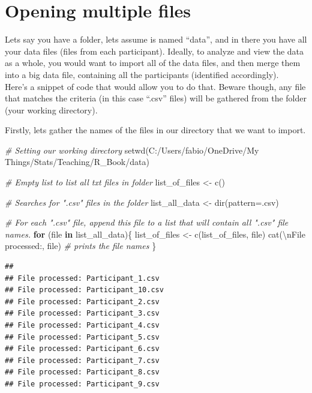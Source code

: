 \documentclass[
]{book}
\newenvironment{Shaded}{\begin{snugshade}}{\end{snugshade}}
\newcommand{\AttributeTok}[1]{\textcolor[rgb]{0.77,0.63,0.00}{#1}}
\newcommand{\CommentTok}[1]{\textcolor[rgb]{0.56,0.35,0.01}{\textit{#1}}}
\newcommand{\ControlFlowTok}[1]{\textcolor[rgb]{0.13,0.29,0.53}{\textbf{#1}}}
\newcommand{\FunctionTok}[1]{\textcolor[rgb]{0.00,0.00,0.00}{#1}}
\newcommand{\NormalTok}[1]{#1}
\newcommand{\OtherTok}[1]{\textcolor[rgb]{0.56,0.35,0.01}{#1}}
\newcommand{\SpecialCharTok}[1]{\textcolor[rgb]{0.00,0.00,0.00}{#1}}
\newcommand{\StringTok}[1]{\textcolor[rgb]{0.31,0.60,0.02}{#1}}
\begin{document}
\hypertarget{opening-multiple-files}{%
\section{Opening multiple files}\label{opening-multiple-files}}

Lets say you have a folder, lets assume is named ``data'', and in there you have all your data files (files from each participant).
Ideally, to analyze and view the data as a whole, you would want to import all of the data files, and then merge them into a big data file, containing all the participants (identified accordingly).\\
Here's a snippet of code that would allow you to do that.
Beware though, any file that matches the criteria (in this case ``.csv'' files) will be gathered from the folder (your working directory).

Firstly, lets gather the names of the files in our directory that we want to import.

\begin{Shaded}
\begin{Highlighting}[]
\CommentTok{\# Setting our working directory}
\FunctionTok{setwd}\NormalTok{(}\StringTok{\textquotesingle{}C:/Users/fabio/OneDrive/My Things/Stats/Teaching/R\_Book/data\textquotesingle{}}\NormalTok{)}

\CommentTok{\# Empty list to list all txt files in folder}
\NormalTok{list\_of\_files }\OtherTok{\textless{}{-}} \FunctionTok{c}\NormalTok{()}

\CommentTok{\# Searches for ".csv" files in the folder}
\NormalTok{list\_all\_data }\OtherTok{\textless{}{-}} \FunctionTok{dir}\NormalTok{(}\AttributeTok{pattern=}\StringTok{\textquotesingle{}.csv\textquotesingle{}}\NormalTok{)}

\CommentTok{\# For each ".csv" file, append this file to a list that will contain all ".csv" file names.}
\ControlFlowTok{for}\NormalTok{ (file }\ControlFlowTok{in}\NormalTok{ list\_all\_data)\{}
\NormalTok{  list\_of\_files }\OtherTok{\textless{}{-}} \FunctionTok{c}\NormalTok{(list\_of\_files, file)}
  \FunctionTok{cat}\NormalTok{(}\StringTok{\textquotesingle{}}\SpecialCharTok{\textbackslash{}n}\StringTok{File processed:\textquotesingle{}}\NormalTok{, file)  }\CommentTok{\# prints the file names}
\NormalTok{\}}
\end{Highlighting}
\end{Shaded}

\begin{verbatim}
## 
## File processed: Participant_1.csv
## File processed: Participant_10.csv
## File processed: Participant_2.csv
## File processed: Participant_3.csv
## File processed: Participant_4.csv
## File processed: Participant_5.csv
## File processed: Participant_6.csv
## File processed: Participant_7.csv
## File processed: Participant_8.csv
## File processed: Participant_9.csv
\end{verbatim}
\end{document}
